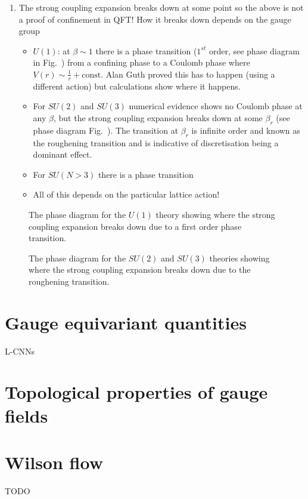 \begin{itemize}
\begin{enumerate}
    \item The strong coupling expansion breaks down at some point so the above is not a proof of confinement in QFT! How it breaks down depends on the gauge group
    \begin{itemize}
        \item $U(1)$: at $\beta \sim 1$ there is a phase transition ($1^{st}$ order, see phase diagram in Fig.~) from a confining phase to a Coulomb phase where $V(r) \sim \frac{1}{r} + \text{const}$. Alan Guth proved this has to happen (using a different action) but calculations show where it happens.
        \item For $SU(2)$ and $SU(3)$ numerical evidence shows no Coulomb phase at any $\beta$, but the strong coupling expansion breaks down at some $\beta_r$ (see phase diagram Fig.~). The transition at $\beta_r$ is infinite order and known as the roughening transition and is indicative of discretisation being a dominant effect.
        \item For $SU(N>3)$ there is a phase transition
        \item All of this depends on the particular lattice action!
    \end{itemize}
\end{enumerate}
\begin{figure}
    \centering
    \caption{The phase diagram for the $U(1)$ theory showing where the strong coupling expansion breaks down due to a first order phase transition.
    \label{fig:strong_coupling_u1}}
\end{figure}
\begin{figure}
    \centering
    \caption{The phase diagram for the $SU(2)$ and $SU(3)$ theories showing where the strong coupling expansion breaks down due to the roughening transition.
    \label{fig:strong_coupling_su23}}
\end{figure}
\end{itemize}

\section{Gauge equivariant quantities}

L-CNNs


\section{Topological properties of gauge fields}

\section{Wilson flow}

TODO
